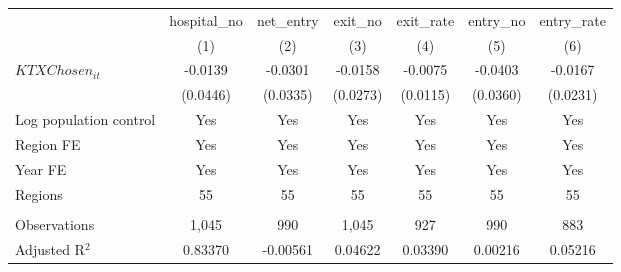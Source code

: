 \begingroup
\centering
\begin{tabular}{lcccccc}
   \toprule
                          & hospital\_no  & net\_entry  & exit\_no  & exit\_rate  & entry\_no  & entry\_rate \\    
                          & (1)           & (2)         & (3)       & (4)         & (5)        & (6)\\  
   \midrule 
   $KTXChosen_{it}$       & -0.0139       & -0.0301     & -0.0158   & -0.0075     & -0.0403    & -0.0167\\   
                          & (0.0446)      & (0.0335)    & (0.0273)  & (0.0115)    & (0.0360)   & (0.0231)\\   
   Log population control & Yes           & Yes         & Yes       & Yes         & Yes        & Yes\\  
   Region FE              & Yes           & Yes         & Yes       & Yes         & Yes        & Yes\\  
   Year FE                & Yes           & Yes         & Yes       & Yes         & Yes        & Yes\\  
   Regions                & 55            & 55          & 55        & 55          & 55         & 55\\  
    \\
   Observations           & 1,045         & 990         & 1,045     & 927         & 990        & 883\\  
   Adjusted R$^2$         & 0.83370       & -0.00561    & 0.04622   & 0.03390     & 0.00216    & 0.05216\\  
   \bottomrule
\end{tabular}
\par\endgroup
